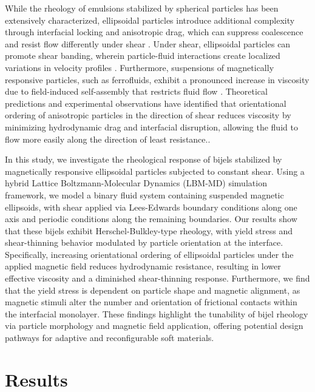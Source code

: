 While the rheology of emulsions stabilized by spherical particles has been extensively characterized, ellipsoidal particles introduce additional complexity through interfacial locking and anisotropic drag, 
which can suppress coalescence and resist flow differently under shear \cite{madivala_self-assembly_2009, daware_emulsions_2015, sun_assembly_2013}. Under shear, ellipsoidal particles 
can promote shear banding, wherein particle-fluid interactions create localized variations in velocity profiles \cite{xu_relation_2013}. Furthermore, suspensions of magnetically responsive particles, 
such as ferrofluids, exhibit a pronounced increase in viscosity due to field-induced self-assembly that restricts fluid flow \cite{qiao_magnetorheological_2012}. 
Theoretical predictions and experimental observations have identified that orientational ordering of anisotropic particles in the direction of shear reduces viscosity by minimizing hydrodynamic drag and interfacial 
disruption, allowing the fluid to flow more easily along the direction of least resistance.\cite{vermant_flow-induced_2005, xu_relation_2013}. 

In this study, we investigate the rheological response of bijels stabilized by magnetically responsive ellipsoidal particles subjected to constant shear. Using a hybrid Lattice Boltzmann-Molecular Dynamics 
(LBM-MD) simulation framework, we model a binary fluid system containing suspended magnetic ellipsoids, with shear applied via Lees-Edwards boundary conditions along one axis and periodic conditions along 
the remaining boundaries. Our results show that these bijels exhibit Herschel-Bulkley-type rheology, with yield stress and shear-thinning behavior modulated by particle orientation at the interface. 
Specifically, increasing orientational ordering of ellipsoidal particles under the applied magnetic field reduces hydrodynamic resistance, resulting in lower effective viscosity and a diminished shear-thinning 
response. Furthermore, we find that the yield stress is dependent on particle shape and magnetic alignment, as magnetic stimuli alter the number and orientation of frictional contacts within the interfacial 
monolayer. These findings highlight the tunability of bijel rheology via particle morphology and magnetic field application, offering potential design pathways for adaptive and reconfigurable soft materials.


\section{Results}\label{sec:results_p3}

